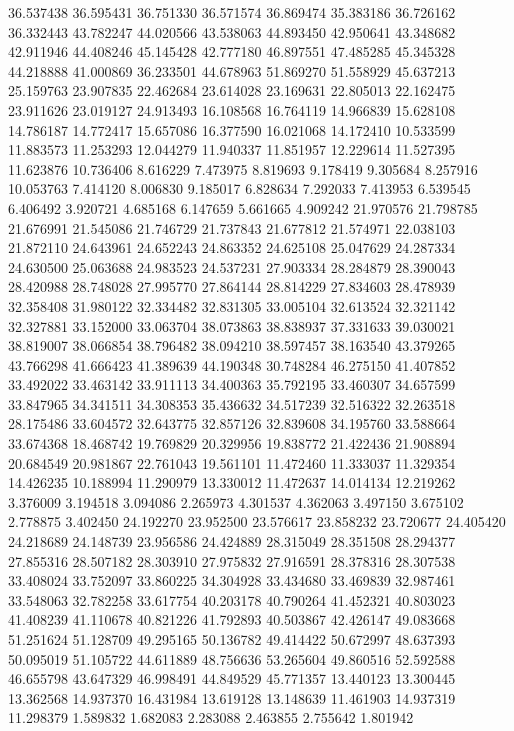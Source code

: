 36.537438
36.595431
36.751330
36.571574
36.869474
35.383186
36.726162
36.332443
43.782247
44.020566
43.538063
44.893450
42.950641
43.348682
42.911946
44.408246
45.145428
42.777180
46.897551
47.485285
45.345328
44.218888
41.000869
36.233501
44.678963
51.869270
51.558929
45.637213
25.159763
23.907835
22.462684
23.614028
23.169631
22.805013
22.162475
23.911626
23.019127
24.913493
16.108568
16.764119
14.966839
15.628108
14.786187
14.772417
15.657086
16.377590
16.021068
14.172410
10.533599
11.883573
11.253293
12.044279
11.940337
11.851957
12.229614
11.527395
11.623876
10.736406
8.616229
7.473975
8.819693
9.178419
9.305684
8.257916
10.053763
7.414120
8.006830
9.185017
6.828634
7.292033
7.413953
6.539545
6.406492
3.920721
4.685168
6.147659
5.661665
4.909242
21.970576
21.798785
21.676991
21.545086
21.746729
21.737843
21.677812
21.574971
22.038103
21.872110
24.643961
24.652243
24.863352
24.625108
25.047629
24.287334
24.630500
25.063688
24.983523
24.537231
27.903334
28.284879
28.390043
28.420988
28.748028
27.995770
27.864144
28.814229
27.834603
28.478939
32.358408
31.980122
32.334482
32.831305
33.005104
32.613524
32.321142
32.327881
33.152000
33.063704
38.073863
38.838937
37.331633
39.030021
38.819007
38.066854
38.796482
38.094210
38.597457
38.163540
43.379265
43.766298
41.666423
41.389639
44.190348
30.748284
46.275150
41.407852
33.492022
33.463142
33.911113
34.400363
35.792195
33.460307
34.657599
33.847965
34.341511
34.308353
35.436632
34.517239
32.516322
32.263518
28.175486
33.604572
32.643775
32.857126
32.839608
34.195760
33.588664
33.674368
18.468742
19.769829
20.329956
19.838772
21.422436
21.908894
20.684549
20.981867
22.761043
19.561101
11.472460
11.333037
11.329354
14.426235
10.188994
11.290979
13.330012
11.472637
14.014134
12.219262
3.376009
3.194518
3.094086
2.265973
4.301537
4.362063
3.497150
3.675102
2.778875
3.402450
24.192270
23.952500
23.576617
23.858232
23.720677
24.405420
24.218689
24.148739
23.956586
24.424889
28.315049
28.351508
28.294377
27.855316
28.507182
28.303910
27.975832
27.916591
28.378316
28.307538
33.408024
33.752097
33.860225
34.304928
33.434680
33.469839
32.987461
33.548063
32.782258
33.617754
40.203178
40.790264
41.452321
40.803023
41.408239
41.110678
40.821226
41.792893
40.503867
42.426147
49.083668
51.251624
51.128709
49.295165
50.136782
49.414422
50.672997
48.637393
50.095019
51.105722
44.611889
48.756636
53.265604
49.860516
52.592588
46.655798
43.647329
46.998491
44.849529
45.771357
13.440123
13.300445
13.362568
14.937370
16.431984
13.619128
13.148639
11.461903
14.937319
11.298379
1.589832
1.682083
2.283088
2.463855
2.755642
1.801942
